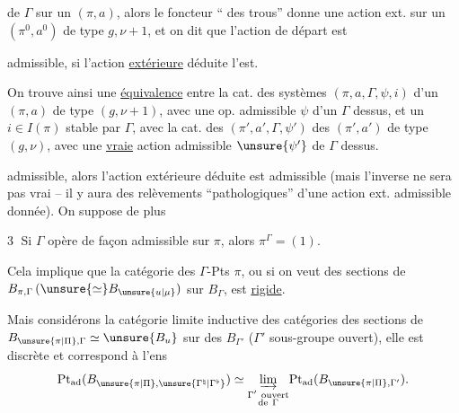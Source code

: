 de $\Gamma$ sur un $(\pi,a)$, alors le foncteur
 `` des trous'' donne une action
ext. sur un $(\pi^0,a^0)$ de type $g,\nu+1$,
et on dit que l'action de départ est


admissible, si l'action \uline{extérieure} déduite l'est.

On trouve ainsi une \uline{équivalence} entre
la cat. des  systèmes $(\pi,a,\Gamma,\psi,i)$
d'un $(\pi,a)$ de type $(g,\nu+1)$, avec une
op.  admissible $\psi$ d'un $\Gamma$ dessus, et
un $i\in I(\pi)$ stable par $\Gamma$, avec la cat.
des $(\pi',a',\Gamma,\psi')$ des $(\pi',a')$ de type
$(g,\nu)$, avec une \uline{vraie} action admissible $\unsure{\psi'}$
de $\Gamma$ dessus.

admissible, alors l'action extérieure déduite
est admissible (mais l'inverse ne
sera pas vrai -- il y aura des relèvements
``pathologiques'' d'une action ext. admissible
donnée). On suppose de plus

\textcircled{3} Si $\Gamma$ opère  de façon admissible sur
$\pi$, alors $\pi^\Gamma=(1)$.

Cela implique que la catégorie des
$\Gamma$-Pts  $\pi$, ou si on veut des sections
de $B_{\pi,\Gamma}\,(\unsure{\simeq}B_{\unsure{u|\mu}})$ sur $B_\Gamma$, est \uline{rigide}.


Mais  considérons la catégorie limite inductive des  catégories des sections de $B_{\unsure{\pi|\Pi},\Gamma}\simeq \unsure{B_u}$ sur des $B_{\Gamma'}$ ($\Gamma'$ sous-groupe ouvert), elle est discrète et correspond à l'ens
\[
\mathrm{Pt}_{\mathrm{ad}}(B_{\unsure{\pi|\Pi},\unsure{\Gamma^{\natural}|\Gamma^{\flat}}})\simeq
\underset{\substack{\Gamma'\ \mathrm{ouvert}\\\mathrm{de}\ \Gamma}}{\varinjlim}
\mathrm{Pt}_{\mathrm{ad}}(B_{\unsure{\pi|\Pi},\Gamma'}).
\]

